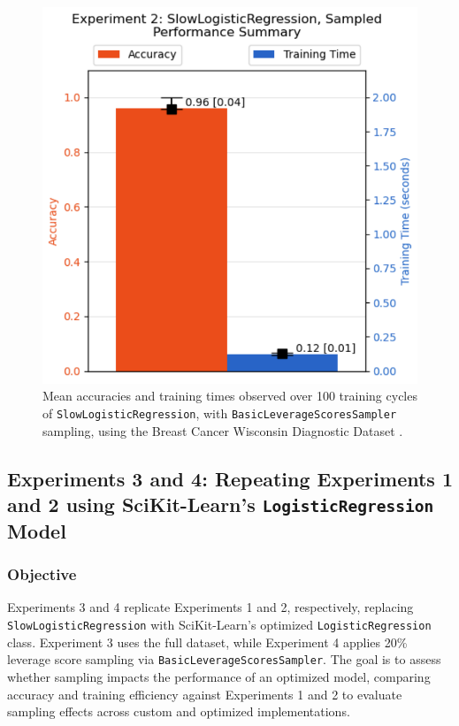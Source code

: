 \documentclass{article}
\theoremstyle{plain}
\theoremstyle{definition}
\theoremstyle{remark}
\begin{document}
\begin{figure}[ht]
	\vskip 0.2in
	\begin{center}
		\centerline{\includegraphics[width=\columnwidth]{experiment_02}}
		\caption{Mean accuracies and training times observed over 100 training cycles of \texttt{SlowLogisticRegression}, with \texttt{BasicLeverageScoresSampler} sampling, using the Breast Cancer Wisconsin Diagnostic Dataset \cite{breastcancer}.}
		\label{experiment_02}
	\end{center}
	\vskip -0.2in
\end{figure}


\subsection{Experiments 3 and 4: Repeating Experiments 1 and 2 using SciKit-Learn's \texttt{LogisticRegression} Model}

\subsubsection{Objective}

Experiments 3 and 4 replicate Experiments 1 and 2, respectively, replacing \texttt{SlowLogisticRegression} with SciKit-Learn's optimized \texttt{LogisticRegression} class. Experiment 3 uses the full dataset, while Experiment 4 applies 20\% leverage score sampling via \texttt{BasicLeverageScoresSampler}. The goal is to assess whether sampling impacts the performance of an optimized model, comparing accuracy and training efficiency against Experiments 1 and 2 to evaluate sampling effects across custom and optimized implementations.
\end{document}
